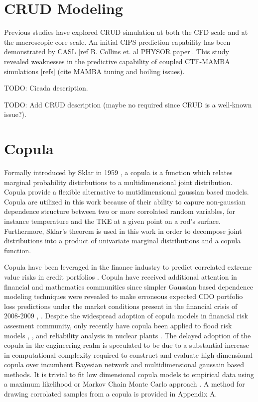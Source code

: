 \section{CRUD Modeling}

Previous studies have explored CRUD simulation at both the CFD scale and at the macroscopic core scale.   An initial CIPS prediction capability has been demonstrated by CASL [ref B. Collins et. al PHYSOR paper].  This study revealed weaknesses in the predictive capability of coupled CTF-MAMBA simulations [refs] (cite MAMBA tuning and boiling issues).

TODO: Cicada description.

TODO: Add CRUD description (maybe no required since CRUD is a well-known issue?).

\section{Copula}

Formally introduced by Sklar in 1959 \cite{Sklar1959}, a copula is a function which relates marginal probability distirbutions to a multidimensional joint distribution.  Copula provide a flexible alternative to mutidimensional gaussian based models.  Copula are utilized in this work because of their ability to capure non-gaussian dependence structure between two or more corrolated random variables, for instance temperature and the TKE at a given point on a rod's surface.  Furthermore, Sklar's theorem is used in this work in order to decompose joint distributions into a product of univariate marginal distributions and a copula function.  

Copula have been leveraged in the finance industry to
predict correlated extreme value risks in credit portfolios
\cite{Geidosch2016}.  Copula have received additional attention in financial and mathematics communities since 
simpler Gaussian based dependence modeling techniques were revealed to make erroneous expected CDO portfolio loss predictions under the market conditions present in the financial crisis of
2008-2009 \cite{MacKenzie2013}, \cite{Li2000}.  Despite the widespread adoption of copula models in financial risk assesment community, only recently have copula been applied to flood risk
models \cite{Dupuis2007}, \cite{Ganguli2012}, and reliability analysis in nuclear plants
\cite{Kelly2007}.  The delayed adoption of the copula in the
engineering realm is speculated to be due to a substantial increase in computational
complexity required to construct and evaluate high dimensional copula over
incumbent Bayesian network and multidimensional gaussain based methods.  
It is trivial to fit low dimensional copula models to empirical data
using a maximum likelihood or Markov Chain Monte Carlo approach \cite{Jouini1996}.
A method for drawing corrolated samples from a copula is provided in Appendix A.


